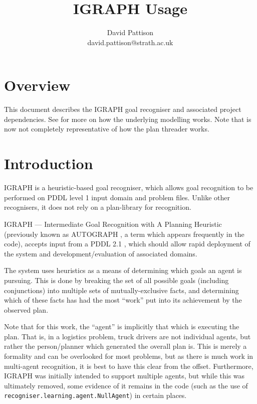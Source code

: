 \documentclass[10pt,a4paper]{article}
\author{David Pattison\\david.pattison@strath.ac.uk}
\title{\textsc{IGRAPH} Usage}
\begin{document}
\maketitle

\section{Overview}

This document describes the \textsc{IGRAPH} goal recogniser and associated project dependencies. See \cite{PattisonPhD,Pattison2010_001,Pattison2010_002} for more on how the underlying modelling works. Note that \cite{Pattison2010_002} is now not completely representative of how the plan threader works.

\section{Introduction}


\textsc{IGRAPH} is a heuristic-based goal recogniser, which allows goal recognition to be performed on \textsc{PDDL} level 1 input domain and problem files. Unlike other recognisers, it does not rely on a plan-library for recognition.


\textsc{IGRAPH} --- Intermediate Goal Recognition with A Planning Heuristic (previously known as \textsc{AUTOGRAPH} \cite{Pattison2010_001}, a term which appears frequently in the code), accepts input from a PDDL 2.1 \cite{Long03}, which should allow rapid deployment of the system and development/evaluation of associated domains.

The system uses heuristics as a means of determining which goals an agent is pursuing. This is done by breaking the set of all possible goals (including conjunctions) into multiple sets of mutually-exclusive facts, and determining which of these facts has had the most ``work'' put into its achievement by the observed plan.

Note that for this work, the ``agent'' is implicitly that which is executing the plan. That is, in a logistics problem, truck drivers are not individual agents, but rather the person/planner which generated the overall plan is. This is merely a formality and can be overlooked for most problems, but as there is much work in multi-agent recognition, it is best to have this clear from the offset. Furthermore, \textsc{IGRAPH} was initially intended to support multiple agents, but while this was ultimately removed, some evidence of it remains in the code (such as the use of \texttt{recogniser.learning.agent.NullAgent}) in certain places.
\end{document}
